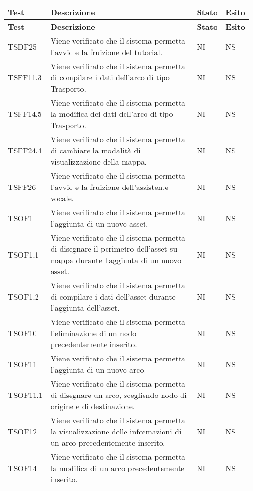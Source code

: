 		\def\arraystretch{1.5}
		\begin{longtable}{p{1.5cm}!{\VRule[1pt]}p{5cm}!{\VRule[1pt]}p{1cm}!{\VRule[1pt]}p{1cm}}
			\color{white} \textbf{Test} & \color{white} \textbf{Descrizione} & \color{white} \textbf{Stato} & \color{white} \textbf{Esito} \\ 
			\endfirsthead 
			\color{white} \textbf{Test} & \color{white} \textbf{Descrizione} & \color{white} \textbf{Stato} & \color{white} \textbf{Esito} \\ 
			\endhead 
			TSDF25 & Viene verificato che il sistema permetta l'avvio e la fruizione del tutorial. & NI & NS \\ 
			TSFF11.3 & Viene verificato che il sistema permetta di compilare i dati dell'arco di tipo Trasporto. & NI & NS \\ 
			TSFF14.5 & Viene verificato che il sistema permetta la modifica dei dati dell'arco di tipo Trasporto. & NI & NS \\ 
			TSFF24.4 & Viene verificato che il sistema permetta di cambiare la modalità di visualizzazione della mappa. & NI & NS \\ 
			TSFF26 & Viene verificato che il sistema permetta l'avvio e la fruizione dell'assistente vocale. & NI & NS \\ 
			TSOF1 & Viene verificato che il sistema permetta l'aggiunta di un nuovo asset. & NI & NS \\ 
			TSOF1.1 & Viene verificato che il sistema permetta di disegnare il perimetro dell'asset su mappa durante l'aggiunta di un nuovo asset. & NI & NS \\ 
			TSOF1.2 & Viene verificato che il sistema permetta di compilare i dati dell'asset durante l'aggiunta dell'asset. & NI & NS \\ 
			TSOF10 & Viene verificato che il sistema permetta l'eliminazione di un nodo precedentemente inserito. & NI & NS \\ 
			TSOF11 & Viene verificato che il sistema permetta l'aggiunta di un nuovo arco. & NI & NS \\ 
			TSOF11.1 & Viene verificato che il sistema permetta di disegnare un arco, scegliendo nodo di origine e di destinazione. & NI & NS \\ 
			TSOF12 & Viene verificato che il sistema permetta la visualizzazione delle informazioni di un arco precedentemente inserito. & NI & NS \\ 
			TSOF14 & Viene verificato che il sistema permetta la modifica di un arco precedentemente inserito. & NI & NS \\ 

\end{longtable}
